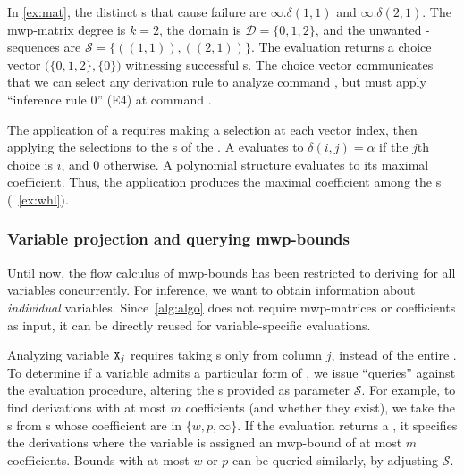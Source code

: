 \begin{example}\label{ex:derivable}
In \autoref{ex:mat}, the distinct s that cause failure are
\(\infty.\delta(1,1)\) and  \(\infty.\delta(2,1)\).
The mwp-matrix degree is \(k=2\), the domain is
\(\mathcal{D}=\{0,1,2\}\), and the unwanted -sequences are \(\mathcal{S} = \{ ((1,1)), ((2,1)) \}\). The
evaluation returns a choice vector \(\big(\{0,1,2\}, \{0\}\big)\) witnessing
successful s. The choice vector communicates that we can
select any derivation rule to analyze command , but must apply
\enquote{inference rule 0} (E4) at command .
\end{example}

The application of a  requires making a selection at each
vector index, then applying the selections to the s of
the . A  evaluates to \(\delta(i, j) =
\alpha\) if the \(j\)th choice is
\(i\), and \(0\) otherwise. A polynomial structure
evaluates to its maximal coefficient. Thus, the
application produces the maximal coefficient among the s
(\cf~\autoref{ex:whl}).

\subsubsection{Variable projection and querying mwp-bounds}
\label{subsec:query}

Until now, the flow calculus of mwp-bounds has been
restricted to deriving  for all variables concurrently. For
 inference, we want to obtain information about
\emph{individual} variables. Since~\autoref{alg:algo} does not require
mwp-matrices or coefficients as
input, it can be directly reused for variable-specific evaluations.

Analyzing variable \(\prm{X}_j\) requires taking s only from column \(j\), instead of the entire
. To determine if a variable admits a particular form of
, we issue \enquote{queries} against the evaluation procedure,
altering the s provided as parameter
\(\mathcal{S}\). For example, to find derivations with at most
\(m\) coefficients (and whether they exist), we take the
s from s whose coefficient are in \(\{w,
p,\infty\}\). If the evaluation returns a
, it specifies the derivations where the variable is assigned
an mwp-bound of at most \(m\) coefficients.
Bounds with at most \(w\) or \(p\) can be queried similarly,
by adjusting \(\mathcal{S}\).

